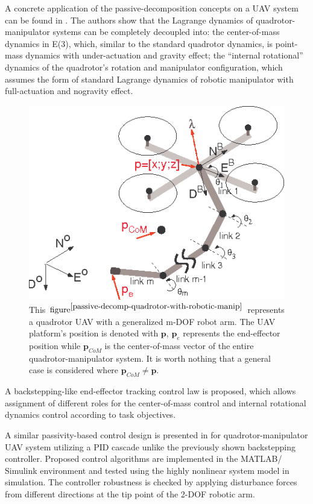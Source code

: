 A concrete application of the passive-decomposition concepts on a UAV system can be found in \cite{passive-decomp-quadrotor-with-robotic-manip}. The authors show that the Lagrange dynamics of quadrotor-manipulator systems can be completely decoupled into: the center-of-mass dynamics in E(3), which, similar to the standard quadrotor dynamics, is point-mass dynamics with under-actuation  and  gravity  effect; the  “internal rotational” dynamics  of  the  quadrotor’s  rotation  and  manipulator configuration, which assumes the form of standard Lagrange dynamics  of  robotic manipulator with full-actuation and nogravity effect.  
\begin{figure}[H]
	\includegraphics[width=0.95\columnwidth]{figure/aerial_manip.png}	
	\centering
	\caption{This $\text{figure}^{\cite{passive-decomp-quadrotor-with-robotic-manip}}$ represents a quadrotor UAV with a generalized m-DOF robot arm. The UAV platform's position is denoted with $\textbf{p}$, $\textbf{p}_e$ represents the end-effector position while $\textbf{p}_{CoM}$ is the center-of-mass vector of the entire quadrotor-manipulator system. It is worth nothing that a general case is considered where $\textbf{p}_{CoM} \neq\textbf{p}$.  }
	\label{fig:aerial_manip}
\end{figure}
\noindent A backstepping-like end-effector tracking control law is proposed, which allows  assignment of different roles for the center-of-mass control and internal rotational dynamics  control according to task objectives.

A similar passivity-based control design is presented in \cite{decoupled-aerial-manipulation} for quadrotor-manipulator UAV system utilizing a PID cascade  unlike the previously shown backstepping controller. Proposed control algorithms are implemented in the MATLAB/
Simulink environment and tested using the highly nonlinear system model in simulation. 
The controller robustness is checked by applying disturbance forces from different 
directions at the tip point of the 2-DOF robotic arm.

